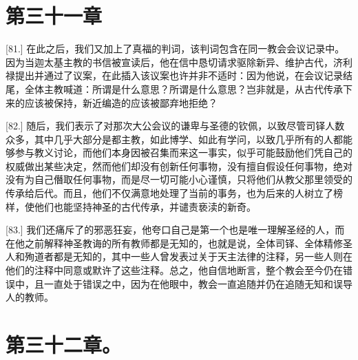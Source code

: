 
\section{第三十一章}

\par

[81.] 在此之后，我们又加上了真福的判词，该判词包含在同一教会会议记录中。因为当迦太基主教的书信被宣读后，他在信中恳切请求驱除新异、维护古代，济利禄提出并通过了议案，在此插入该议案也许并非不适时：因为他说，在会议记录结尾，全体主教喊道：所谓是什么意思？所谓是什么意思？岂非就是，从古代传承下来的应该被保持，新近编造的应该被鄙弃地拒绝？\par

[82.] 随后，我们表示了对那次大公会议的谦卑与圣德的钦佩，以致尽管司铎人数众多，其中几乎大部分是都主教，如此博学、如此有学问，以致几乎所有的人都能够参与教义讨论，而他们本身因被召集而来这一事实，似乎可能鼓励他们凭自己的权威做出某些决定，然而他们却没有创新任何事物，没有擅自假设任何事物，绝对没有为自己僭取任何事物，而是尽一切可能小心谨慎，只将他们从教父那里领受的传承给后代。而且，他们不仅满意地处理了当前的事务，也为后来的人树立了榜样，使他们也能坚持神圣的古代传承，并谴责亵渎的新奇。\par

[83.] 我们还痛斥了的邪恶狂妄，他夸口自己是第一个也是唯一理解圣经的人，而在他之前解释神圣教诲的所有教师都是无知的，也就是说，全体司铎、全体精修圣人和殉道者都是无知的，其中一些人曾发表过关于天主法律的注释，另一些人则在他们的注释中同意或默许了这些注释。总之，他自信地断言，整个教会至今仍在错误中，且一直处于错误之中，因为在他眼中，教会一直追随并仍在追随无知和误导人的教师。\par


\section{第三十二章。}

